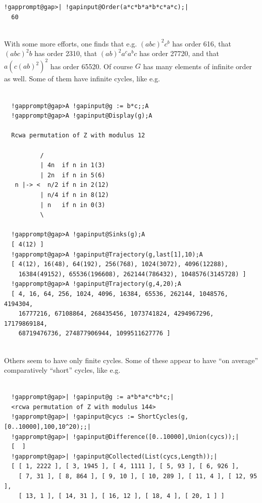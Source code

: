 \documentclass[a4paper,11pt]{report}
\begin{document}
{{\begin{Verbatim}[commandchars=!@|,fontsize=\small,frame=single,label=Example]
  !gapprompt@gap>| !gapinput@Order(a*c*b*a*b*c*a*c);|
  60
  
\end{Verbatim}
 With some more efforts, one finds that e.g. $(abc)^2c^b$ has order 616, that $(abc)^2b$ has order 2310, that $(ab)^2a^ca^bc$ has order 27720, and that $a(c(ab)^2)^2$ has order 65520. Of course $G$ has many elements of infinite order as well. Some of them have infinite
cycles, like e.g. 
\begin{Verbatim}[commandchars=!@A,fontsize=\small,frame=single,label=Example]
  
  !gapprompt@gap>A !gapinput@g := b*c;;A
  !gapprompt@gap>A !gapinput@Display(g);A
  
  Rcwa permutation of Z with modulus 12
  
          /
          | 4n  if n in 1(3)
          | 2n  if n in 5(6)
   n |-> <  n/2 if n in 2(12)
          | n/4 if n in 8(12)
          | n   if n in 0(3)
          \
  
  !gapprompt@gap>A !gapinput@Sinks(g);A
  [ 4(12) ]
  !gapprompt@gap>A !gapinput@Trajectory(g,last[1],10);A
  [ 4(12), 16(48), 64(192), 256(768), 1024(3072), 4096(12288), 
    16384(49152), 65536(196608), 262144(786432), 1048576(3145728) ]
  !gapprompt@gap>A !gapinput@Trajectory(g,4,20);A
  [ 4, 16, 64, 256, 1024, 4096, 16384, 65536, 262144, 1048576, 4194304, 
    16777216, 67108864, 268435456, 1073741824, 4294967296, 17179869184, 
    68719476736, 274877906944, 1099511627776 ]
  
\end{Verbatim}
 Others seem to have only finite cycles. Some of these appear to have ``on average'' comparatively ``short'' cycles, like e.g. 
\begin{Verbatim}[commandchars=!@|,fontsize=\small,frame=single,label=Example]
  
  !gapprompt@gap>| !gapinput@g := a*b*a*c*b*c;|
  <rcwa permutation of Z with modulus 144>
  !gapprompt@gap>| !gapinput@cycs := ShortCycles(g,[0..10000],100,10^20);;|
  !gapprompt@gap>| !gapinput@Difference([0..10000],Union(cycs));|
  [  ]
  !gapprompt@gap>| !gapinput@Collected(List(cycs,Length));|
  [ [ 1, 2222 ], [ 3, 1945 ], [ 4, 1111 ], [ 5, 93 ], [ 6, 926 ], 
    [ 7, 31 ], [ 8, 864 ], [ 9, 10 ], [ 10, 289 ], [ 11, 4 ], [ 12, 95 ], 
    [ 13, 1 ], [ 14, 31 ], [ 16, 12 ], [ 18, 4 ], [ 20, 1 ] ]
  

\end{Verbatim}}}
\end{document}

